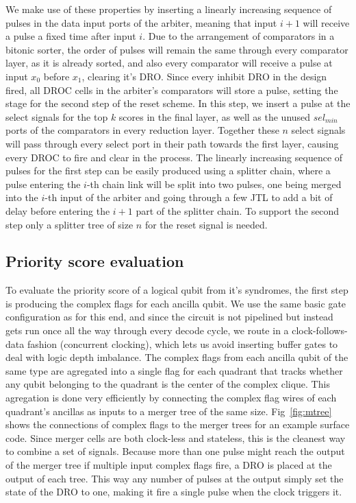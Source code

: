 \documentclass[conference]{IEEEtran}
\begin{document}
We make use of these properties by inserting a linearly increasing sequence of pulses in the data input ports of the arbiter, meaning that input $i+1$ will receive a pulse a fixed time after input $i$.
Due to the arrangement of comparators in a bitonic sorter, the order of pulses will remain the same through every comparator layer, as it is already sorted, and also every comparator will receive a pulse at input $x_0$ before $x_1$, clearing it's DRO.
Since every inhibit DRO in the design fired, all DROC cells in the arbiter's comparators will store a pulse, setting the stage for the second step of the reset scheme.
In this step, we insert a pulse at the select signals for the top $k$ scores in the final layer, as well as the unused $sel_{min}$ ports of the comparators in every reduction layer.
Together these $n$ select signals will pass through every select port in their path towards the first layer, causing every DROC to fire and clear in the process.
The linearly increasing sequence of pulses for the first step can be easily produced using a splitter chain, where a pulse entering the $i$-th chain link will be split into two pulses, one being merged into the $i$-th input of the arbiter and going through a few JTL to add a bit of delay before entering the $i+1$ part of the splitter chain.
To support the second step only a splitter tree of size $n$ for the reset signal is needed.

\subsection{Priority score evaluation}

To evaluate the priority score of a logical qubit from it's syndromes, the first step is producing the complex flags for each ancilla qubit.
We use the same basic gate configuration as \cite{btwc} for this end, and since the circuit is not pipelined but instead gets run once all the way through every decode cycle, we route in a clock-follows-data fashion (concurrent clocking), which lets us avoid inserting buffer gates to deal with logic depth imbalance.
The complex flags from each ancilla qubit of the same type are agregated into a single flag for each quadrant that tracks whether any qubit belonging to the quadrant is the center of the complex clique.
This agregation is done very efficiently by connecting the complex flag wires of each quadrant's ancillas as inputs to a merger tree of the same size.
Fig~\ref{fig:mtree} shows the connections of complex flags to the merger trees for an example surface code.
Since merger cells are both clock-less and stateless, this is the cleanest way to combine a set of signals.
Because more than one pulse might reach the output of the merger tree if multiple input complex flags fire, a DRO is placed at the output of each tree.
This way any number of pulses at the output simply set the state of the DRO to one, making it fire a single pulse when the clock triggers it.
\end{document}
